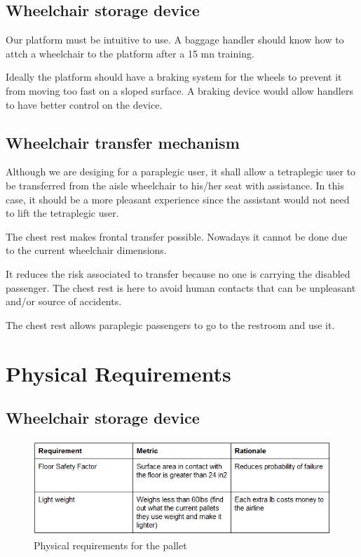 \subsection*{Wheelchair storage device}

\begin{list}{-}{}
  \item Our platform must be intuitive to use. A baggage handler should know how to attch a wheelchair to the platform after a 15 mn training.
  \item Ideally the platform should have a braking system for the wheels to prevent it from moving too fast on a sloped surface. A braking device would allow handlers to have better control on the device.
\end{list}

\subsection*{Wheelchair transfer mechanism}

\begin{list}{-}{}
  \item Although we are desiging for a paraplegic user, it shall allow a tetraplegic user to be transferred from the aisle wheelchair to his/her seat with assistance. In this case, it should be a more pleasant experience since the assistant would not need to lift the tetraplegic user.
  \item The chest rest makes frontal transfer possible. Nowadays it cannot be done due to the current wheelchair dimensions.
  \item It reduces the risk associated to transfer because no one is carrying the disabled passenger. The chest rest is here to avoid human contacts that can be unpleasant and/or source of accidents.
  \item The chest rest allows paraplegic passengers to go to the restroom and use it.
\end{list}


\section{Physical Requirements}

\subsection*{Wheelchair storage device}

\begin{figure}[h!]
  \centering
     \includegraphics[scale=1]{images/physical_requirements_pallet.png}
   \caption{Physical requirements for the pallet}
  \label{fig:phy_req_pallet}
\end{figure}

